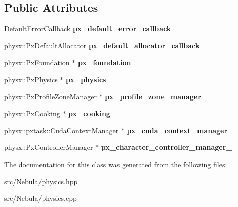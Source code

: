 \subsection*{\-Public \-Attributes}
\begin{DoxyCompactItemize}
\item 
\hypertarget{classNeb_1_1physics_a94f4acbaaa5742c633007fd6b3819c5b}{\hyperlink{classDefaultErrorCallback}{\-Default\-Error\-Callback} {\bfseries px\-\_\-default\-\_\-error\-\_\-callback\-\_\-}}\label{classNeb_1_1physics_a94f4acbaaa5742c633007fd6b3819c5b}

\item 
\hypertarget{classNeb_1_1physics_a0415a6eb0242881540994bd7a667e32c}{physx\-::\-Px\-Default\-Allocator {\bfseries px\-\_\-default\-\_\-allocator\-\_\-callback\-\_\-}}\label{classNeb_1_1physics_a0415a6eb0242881540994bd7a667e32c}

\item 
\hypertarget{classNeb_1_1physics_ad10a620fe6052b1db0fad0ed97d52ebb}{physx\-::\-Px\-Foundation $\ast$ {\bfseries px\-\_\-foundation\-\_\-}}\label{classNeb_1_1physics_ad10a620fe6052b1db0fad0ed97d52ebb}

\item 
\hypertarget{classNeb_1_1physics_ab98dfdf9b8671f794f6f5811e4f1319a}{physx\-::\-Px\-Physics $\ast$ {\bfseries px\-\_\-physics\-\_\-}}\label{classNeb_1_1physics_ab98dfdf9b8671f794f6f5811e4f1319a}

\item 
\hypertarget{classNeb_1_1physics_a0fad63bf6306306fb22d3f58560d1c11}{physx\-::\-Px\-Profile\-Zone\-Manager $\ast$ {\bfseries px\-\_\-profile\-\_\-zone\-\_\-manager\-\_\-}}\label{classNeb_1_1physics_a0fad63bf6306306fb22d3f58560d1c11}

\item 
\hypertarget{classNeb_1_1physics_a041b8e5a85614606bc821d4a8d5d88d2}{physx\-::\-Px\-Cooking $\ast$ {\bfseries px\-\_\-cooking\-\_\-}}\label{classNeb_1_1physics_a041b8e5a85614606bc821d4a8d5d88d2}

\item 
\hypertarget{classNeb_1_1physics_a1292b571e26510adef2bd316797071c0}{physx\-::pxtask\-::\-Cuda\-Context\-Manager $\ast$ {\bfseries px\-\_\-cuda\-\_\-context\-\_\-manager\-\_\-}}\label{classNeb_1_1physics_a1292b571e26510adef2bd316797071c0}

\item 
\hypertarget{classNeb_1_1physics_aa3c2db56b039c1380242e968de69250f}{physx\-::\-Px\-Controller\-Manager $\ast$ {\bfseries px\-\_\-character\-\_\-controller\-\_\-manager\-\_\-}}\label{classNeb_1_1physics_aa3c2db56b039c1380242e968de69250f}

\end{DoxyCompactItemize}


\-The documentation for this class was generated from the following files\-:\begin{DoxyCompactItemize}
\item 
src/\-Nebula/physics.\-hpp\item 
src/\-Nebula/physics.\-cpp\end{DoxyCompactItemize}
